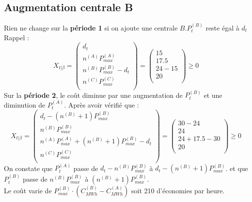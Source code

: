 \documentclass{article}
\begin{document}
\subsection{Augmentation centrale B}
Rien ne change sur la \textbf{période 1} si on ajoute une centrale $B$.$P_t^{(B)}$ reste égal à $d_t$\\
Rappel : 
$$
X_{t|\beta} = \left(
\begin{array}{c}
    d_t \\
    n^{(A)}P_{max}^{(A)} \\
    n^{(B)}P_{max}^{(B)} - d_t \\
    n^{(C)}P_{max}^{(C)} \\
\end{array}
\right)=
\left(
\begin{array}{c}
    15 \\
    17.5 \\
    24-15 \\
    20 \\
\end{array}
\right)
\geq 0
$$
Sur la \textbf{période 2}, le coût diminue par une augmentation de $P_t^{(B)}$ et une diminution de $P_t^{(A)}$.
Après avoir vérifié que : \\
$$
X_{t|\beta} = 
\left(
\begin{array}{c}
    d_t - (n^{(B)}+1)P_{max}^{(B)} \\
    n^{(B)}P_{max}^{(B)} \\
    n^{(A)}P_{max}^{(A)}+(n^{(B)}+1)P_{max}^{(B)} - d_t \\
    n^{(C)}P_{max}^{(C)} \\
\end{array}\right)=
\left(
\begin{array}{c}
    30 - 24 \\
    24 \\
    24+17.5 - 30 \\
    20 \\
\end{array}\right)
\geq 0
$$
On constate que $P_t^{(A)}$ passe de $d_t - n^{(B)}P_{max}^{(B)}$ à $d_t - (n^{(B)}+1)P_{max}^{(B)}$. et que $P_t^{(B)}$ passe de $n^{(B)}P_{max}^{(B)}$ à $(n^{(B)}+1)P_{max}^{(B)}$.\\
Le coût varie de $P_{max}^{(B)}\cdot (C_{MWh}^{(B)}-C_{MWh}^{(A)})$ soit 210 d'économies par heure.
\end{document}
